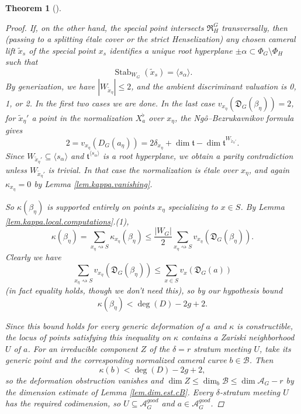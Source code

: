 \documentclass[openany]{amsbook}
\newtheorem{theorem}{Theorem}[chapter]
\theoremstyle{definition}
\theoremstyle{remark}
\numberwithin{equation}{section}
\newcommand{\cA}{\mathcal{A}}
\newcommand{\cB}{\mathcal{B}}
\renewcommand{\-}{\operatorname{-}}
\newcommand{\on}[1]{\operatorname{#1}}
\newcommand{\good}{\mathit{good}}
\newcommand{\wtilde}[1]{\widetilde{#1}}
\newcommand{\ft}{\mathfrak{t}}
\newcommand{\fD}{\mathfrak{D}}
\newcommand{\fR}{\mathfrak{R}}
\begin{document}
\begin{theorem}[{\cite[Th\'eor\`eme 9.1.3]{CLII}}]
\begin{proof}
        If, on the other hand, the special point intersects $\fR_H^G$ transversally, then (passing to a splitting \'etale cover or the strict Henselization) any chosen cameral lift $\wtilde{x}_s$ of the special point $x_s$ identifies a unique root hyperplane $\pm \alpha \subset \Phi_G \setminus \Phi_H$ such that $$\on{Stab}_{W_G}(\wtilde{x}_s) = \langle s_\alpha \rangle.$$ By generization, we have $|W_{\wtilde{x}_\eta}| \le 2$, and the ambient discriminant valuation is 0, 1, or 2. In the first two cases we are done. In the last case $v_{x_\eta}(\fD_G(\beta_\eta)) = 2$, for $\wtilde{x}_\eta'$ a point in the normalization $X^\flat_a$ over $x_\eta$, the Ng\^{o}--Bezrukavnikov formula gives
        $$
            2 = v_{x_\eta}(D_G(a_\eta)) = 2 \delta_{x_\eta} + \dim \ft - \dim \ft^{W_{\wtilde{x}_\eta'}}.
        $$
        Since $W_{\wtilde{x}_\eta'} \subseteq \langle s_\alpha \rangle$ and $\ft^{\langle s_\alpha \rangle}$ is a root hyperplane, we obtain a parity contradiction unless $W_{\wtilde{x}_\eta'}$ is trivial. In that case the normalization is \'etale over $x_\eta$, and again $\kappa_{x_\eta} = 0$ by Lemma \ref{lem.kappa.vanishing}. 

        So $\kappa(\beta_\eta)$ is supported entirely on points $x_\eta$ specializing to $x \in S$. By Lemma \ref{lem.kappa.local.computations}.(1),
        $$
            \kappa(\beta_\eta) = \sum_{x_\eta \rightsquigarrow S} \kappa_{x_\eta}(\beta_\eta) \le \frac{|W_G|}{2} \sum_{x_\eta \rightsquigarrow S} v_{x_\eta}(\fD_G(\beta_\eta)).
        $$
        Clearly we have 
        $$
            \sum_{x_\eta \rightsquigarrow S} v_{x_\eta}(\fD_G(\beta_\eta)) \le \sum_{x \in S} v_x(\fD_G(a))
        $$
        (in fact equality holds, though we don't need this), so by our hypothesis bound
        $$
            \kappa(\beta_\eta) < \deg(D) - 2g + 2.
        $$

        Since this bound holds for every generic deformation of $a$ and $\kappa$ is constructible, the locus of points satisfying this inequality on $\kappa$ contains a Zariski neighborhood $U$ of $a$. For an irreducible component $Z$ of the $\delta = r$ stratum meeting $U$, take its generic point and the corresponding normalized cameral curve $b \in \cB$. Then 
        $$
            \kappa(b) < \deg(D) - 2g + 2,
        $$
        so the deformation obstruction vanishes and $\dim Z \le \dim_b \cB \le \dim \cA_G - r$ by the dimension estimate of Lemma \ref{lem.dim.est.cB}. Every $\delta$-stratum meeting $U$ has the required codimension, so $U \subseteq \cA_G^{\good}$ and $a \in \cA_G^{\good}$.
    \end{proof}
\end{theorem}
\end{document}
